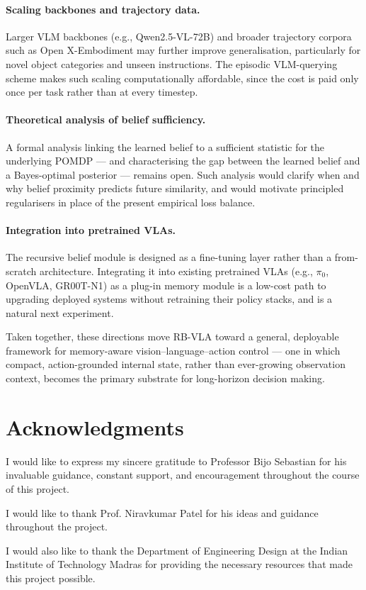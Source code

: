 \documentclass[12pt]{article}
\begin{document}
\paragraph{Scaling backbones and trajectory data.} Larger VLM backbones (e.g., Qwen2.5-VL-72B) and broader trajectory corpora such as Open X-Embodiment may further improve generalisation, particularly for novel object categories and unseen instructions. The episodic VLM-querying scheme makes such scaling computationally affordable, since the cost is paid only once per task rather than at every timestep.

\paragraph{Theoretical analysis of belief sufficiency.} A formal analysis linking the learned belief to a sufficient statistic for the underlying POMDP --- and characterising the gap between the learned belief and a Bayes-optimal posterior --- remains open. Such analysis would clarify when and why belief proximity predicts future similarity, and would motivate principled regularisers in place of the present empirical loss balance.

\paragraph{Integration into pretrained VLAs.} The recursive belief module is designed as a fine-tuning layer rather than a from-scratch architecture. Integrating it into existing pretrained VLAs (e.g., $\pi_0$, OpenVLA, GR00T-N1) as a plug-in memory module is a low-cost path to upgrading deployed systems without retraining their policy stacks, and is a natural next experiment.

Taken together, these directions move RB-VLA toward a general, deployable framework for memory-aware vision--language--action control --- one in which compact, action-grounded internal state, rather than ever-growing observation context, becomes the primary substrate for long-horizon decision making.

\section*{Acknowledgments}
I would like to express my sincere gratitude to Professor Bijo Sebastian for his invaluable guidance, constant support, and encouragement throughout the course of this project.

I would like to thank Prof. Niravkumar Patel for his ideas and guidance throughout the project.

I would also like to thank the Department of Engineering Design at the Indian Institute of Technology Madras for providing the necessary resources that made this project possible.



\end{document}
